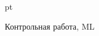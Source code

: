 \documentclass[pdftex,12pt,a4paper]{article}
\begin{document}
 pt %

\begin{center}
Контрольная работа, ML
\end{center}

\WhiteRoseLine


\RedRoseLine
\end{document}
